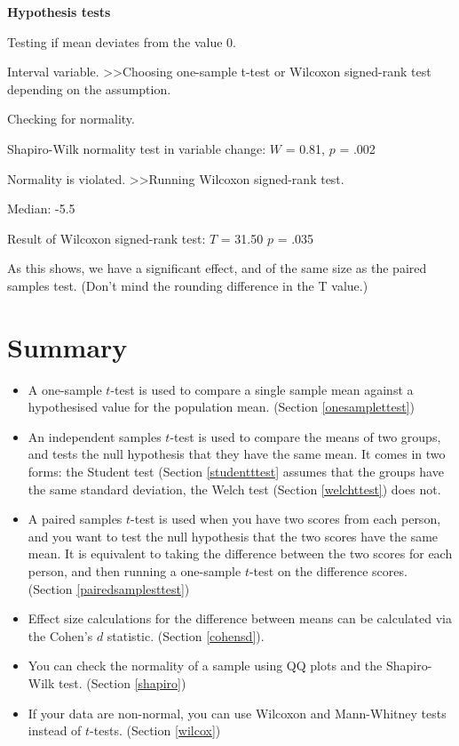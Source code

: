 \documentclass[
]{book}
\providecommand{\tightlist}{%
  \setlength{\itemsep}{0pt}\setlength{\parskip}{0pt}}
\theoremstyle{definition}
\theoremstyle{definition}
\theoremstyle{definition}
\theoremstyle{definition}
\theoremstyle{remark}
\begin{document}
\begin{tcolorbox}[colback=white,
  colframe=lightgray,
  coltext=black,
  boxsep=4pt,
  boxrule=0.3pt,
  arc=0pt]
  {   \sffamily
      \color{CSblue}\textbf{Hypothesis tests}
      
      \color{CSgreen}Testing if mean deviates from the value 0.
      
      Interval variable. \textgreater\textgreater  Choosing one-sample t-test or Wilcoxon signed-rank test depending on the assumption.

      Checking for normality.

      \color{black}
      Shapiro-Wilk normality test in variable change: $W$ = 0.81, $p$ = .002

      \color{CSgreen}
      Normality is violated. \textgreater\textgreater Running Wilcoxon signed-rank test.

      \color{black}
      Median: -5.5

      Result of Wilcoxon signed-rank test: $T$ = 31.50 $p$ = .035
      \normalfont
  }
\end{tcolorbox}

As this shows, we have a significant effect, and of the same size as the paired samples test. (Don't mind the rounding difference in the T value.)

\hypertarget{summary-6}{%
\section{Summary}\label{summary-6}}

\begin{itemize}
\tightlist
\item
  A one-sample \(t\)-test is used to compare a single sample mean against a hypothesised value for the population mean. (Section \ref{onesamplettest})
\item
  An independent samples \(t\)-test is used to compare the means of two groups, and tests the null hypothesis that they have the same mean. It comes in two forms: the Student test (Section \ref{studentttest} assumes that the groups have the same standard deviation, the Welch test (Section \ref{welchttest}) does not.
\item
  A paired samples \(t\)-test is used when you have two scores from each person, and you want to test the null hypothesis that the two scores have the same mean. It is equivalent to taking the difference between the two scores for each person, and then running a one-sample \(t\)-test on the difference scores. (Section \ref{pairedsamplesttest})
\item
  Effect size calculations for the difference between means can be calculated via the Cohen's \(d\) statistic. (Section \ref{cohensd}).
\item
  You can check the normality of a sample using QQ plots and the Shapiro-Wilk test. (Section \ref{shapiro})
\item
  If your data are non-normal, you can use Wilcoxon and Mann-Whitney tests instead of \(t\)-tests. (Section \ref{wilcox})
\end{itemize}
\end{document}
